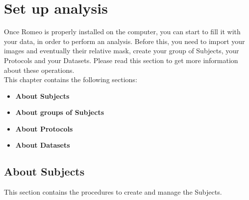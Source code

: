 \section{Set up analysis}
\label{setupanalysis}
Once Romeo is properly installed on the computer, you can start to fill it with your data, in order to perform an analysis. Before this, you need to import your images and eventually their relative mask, create your group of Subjects\g{}, your Protocols\g{} and your Datasets\g{}. Please read this section to get more information about these operations.\\
This chapter contains the following sections:
\begin{itemize}
\item \textbf{About Subjects}
\item \textbf{About groups of Subjects}
\item \textbf{About Protocols}
\item \textbf{About Datasets}
\end{itemize}

\subsection{About Subjects}
\label{aboutsubject}
This section contains the procedures to create and manage the Subjects\g{}.

